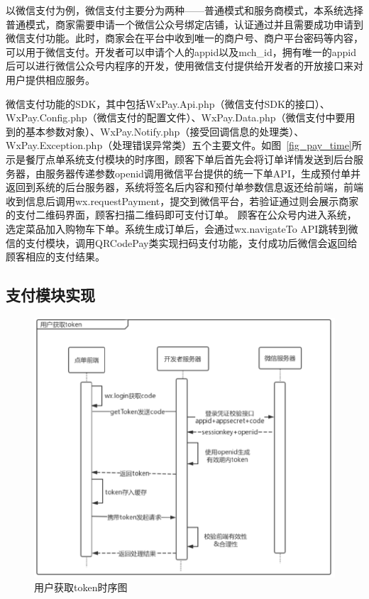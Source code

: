 以微信支付为例，微信支付主要分为两种——普通模式和服务商模式，本系统选择普通模式，商家需要申请一个微信公众号绑定店铺，认证通过并且需要成功申请到微信支付功能。此时，商家会在平台中收到唯一的商户号、商户平台密码等内容，可以用于微信支付。开发者可以申请个人的appid以及mch\_id，拥有唯一的appid后可以进行微信公众号内程序的开发，使用微信支付提供给开发者的开放接口来对用户提供相应服务。

微信支付功能的SDK，其中包括WxPay.Api.php（微信支付SDK的接口）、WxPay.Config.php（微信支付的配置文件）、WxPay.Data.php（微信支付中要用到的基本参数对象）、WxPay.Notify.php（接受回调信息的处理类）、WxPay.Exception.php（处理错误异常类）五个主要文件。如图~\ref{fig_pay_time}所示是餐厅点单系统支付模块的时序图，顾客下单后首先会将订单详情发送到后台服务器，由服务器传递参数openid调用微信平台提供的统一下单API，生成预付单并返回到系统的后台服务器，系统将签名后内容和预付单参数信息返还给前端，前端收到信息后调用wx.requestPayment，提交到微信平台，若验证通过则会展示商家的支付二维码界面，顾客扫描二维码即可支付订单。
顾客在公众号内进入系统，选定菜品加入购物车下单。系统生成订单后，会通过wx.navigateTo API跳转到微信的支付模块，调用QRCodePay类实现扫码支付功能，支付成功后微信会返回给顾客相应的支付结果。\\

\subsection{支付模块实现}
\begin{figure}[htbp!]
    \centering
    \includegraphics[width=5in]{FIGs/chapter4/pay_token.pdf}
    \caption{用户获取token时序图}\label{fig_pay_token}
\end{figure}

